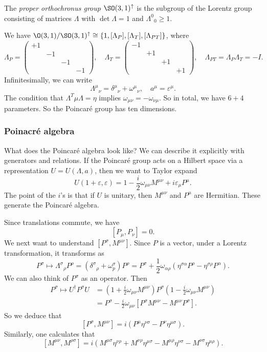 \documentclass[a4paper]{article}
\begin{document}
\begin{defi}
  The \emph{proper orthochronus group} $\SO(3, 1)^\uparrow$ is the subgroup of the Lorentz group consisting of matrices $\Lambda$ with $\det \Lambda = 1$ and $\Lambda^0\!_0 \geq 1$.
\end{defi}
We have $\O(3, 1) / \SO(3, 1)^{\uparrow} \cong \{1, [\Lambda_P], [\Lambda_T], [\Lambda_{PT}] \}$, where
\[
  \Lambda_P=
  \begin{pmatrix}
    +1 \\
    & -1\\
    & & -1\\
    & & & -1
  \end{pmatrix},\quad \Lambda_T =
  \begin{pmatrix}
    -1 \\
    & +1\\
    & & +1\\
    & & & +1
  \end{pmatrix},\quad
  \Lambda_{PT} = \Lambda_P \Lambda_T = -I.
\]
Infinitesimally, we can write
\[
  \Lambda^\mu\!_\nu = \delta^\mu\!_\nu + \omega^\mu\!_\nu, \quad a^\mu = \varepsilon^\mu.
\]
The condition that $\Lambda^T \mu \Lambda = \eta$ implies $\omega_{\mu\nu} = -\omega_{\nu\mu}$. So in total, we have $6 + 4$ parameters. So the Poincar\'e group has ten dimensions.

\subsubsection*{Poinacr\'e algebra}
What does the Poincar\'e algebra look like? We can describe it explicitly with generators and relations. If the Poincar\'e group acts on a Hilbert space via a representation $U = U(\Lambda, a)$, then we want to Taylor expand
\[
  U(1 + \varepsilon, \varepsilon) = 1 - \frac{i}{2} \omega_{\mu\nu} M^{\mu\nu} + i \varepsilon_\mu P^\mu.
\]
The point of the $i$'s is that if $U$ is unitary, then $M^{\mu\nu}$ and $P^\mu$ are Hermitian. These generate the Poincar\'e algebra.

Since translations commute, we have
\[
  [P_\mu, P_\nu] = 0.
\]
We next want to understand $[P^\sigma, M^{\mu\nu}]$. Since $P$ is a vector, under a Lorentz transformation, it transforms as
\[
  P^\sigma \mapsto \Lambda^\sigma\!_\rho P^\rho = (\delta^\sigma\!_\rho + \omega^\sigma_p) P^\rho = P^\sigma + \frac{1}{2} \omega_{\alpha \rho} (\eta^{\sigma \alpha} P^\rho - \eta^{\sigma \rho} P^\alpha).
\]
We can also think of $P^\sigma$ as an operator. Then
\begin{align*}
  P^\sigma \mapsto U^\dagger P^\sigma U &= \left(1 + \frac{i}{2} \omega_{\mu\nu} M^{\mu\nu}\right) P^\sigma \left(1 - \frac{i}{2} \omega_{\mu\nu} M^{\mu\nu}\right)\\
  &= P^\sigma - \frac{i}{2} \omega_{\mu\nu} [P^\sigma M^{\mu\nu} - M^{\mu\nu} P^\sigma].
\end{align*}
So we deduce that
\[
  [P^\sigma, M^{\mu\nu}] = i (P^\mu \eta^{\nu \sigma} - P^\nu \eta^{\mu \sigma}).
\]
Similarly, one calculates that
\[
  [M^{\mu\nu}, M^{\rho \sigma}] = i (M^{\mu\sigma} \eta^{\nu \rho} + M^{\nu \rho} \eta^{\mu\sigma} - M^{\mu \rho} \eta^{\nu \sigma} - M^{\nu \sigma} \eta^{\mu \rho}).
\]
\end{document}
